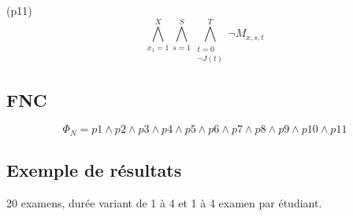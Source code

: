 \documentclass[a4paper,11pt]{article}
\begin{document}
(p11)
\begin{displaymath}
\bigwedge\limits_{x_{1}=1}^{X}\bigwedge\limits_{s=1}^{S}\bigwedge\limits_{\substack{t=0 \\ \neg J(t) }}^{T} 
\neg M_{x, s, t}
\end{displaymath}

\subsection{FNC}
\begin{displaymath}
	\Phi_{N} = p1 \wedge p2 \wedge p3 \wedge p4 \wedge p5 \wedge p6 \wedge p7 \wedge p8 \wedge p9 \wedge p10 \wedge p11
\end{displaymath}
\subsection{Exemple de résultats}
20 examens, durée variant de 1 à 4 et 1 à 4 examen par étudiant.
\end{document}
